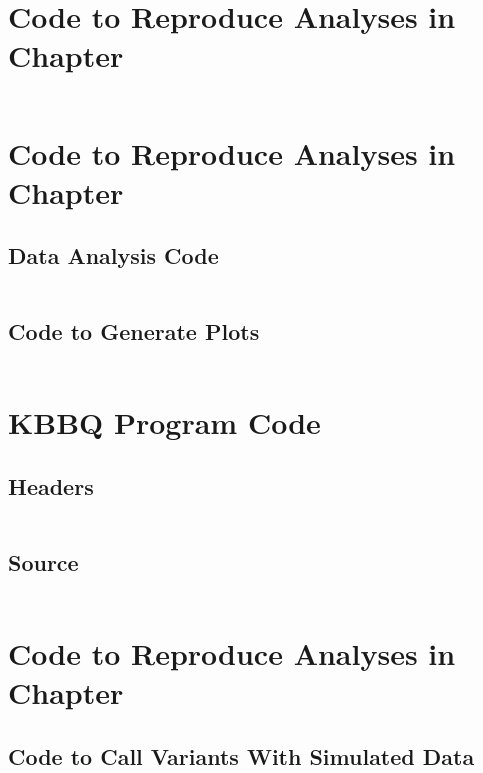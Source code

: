 \chapter{Code to Reproduce Analyses in Chapter \protect\structuredref{}}
\label{ch:structured_code}
\newpage
\inputminted[breaklines, breakanywhere, tabsize=2]{Makefile}{ch3/scripts/ch3_makefiles.txt}

\chapter{Code to Reproduce Analyses in Chapter \protect\kbbqref{}}
\label{ch:kbbq_plot_code}
\newpage
\section{Data Analysis Code}
\inputminted[breaklines, breakanywhere, tabsize=2]{Makefile}{ch4/scripts/ch4_makefiles.txt}
\section{Code to Generate Plots}
\inputminted[breaklines, breakanywhere, tabsize=2]{r}{ch4/scripts/plot_benchmarks.R}

\chapter{KBBQ Program Code}
\label{ch:kbbq_code}
\newpage
\section{Headers}
\inputminted[breaklines, breakanywhere, tabsize=2]{cpp}{ch4/scripts/kbbq_include.hh}
\section{Source}
\inputminted[breaklines, breakanywhere, tabsize=2]{cpp}{ch4/scripts/kbbq_src.cc}

\chapter{Code to Reproduce Analyses in Chapter \protect\evaluatingref{}}
\label{ch:evaluating_code}
\newpage
\section{Code to Call Variants With Simulated Data}
\inputminted[breaklines, breakanywhere, tabsize=2]{Makefile}{ch5/scripts/sim_variants_makefiles.txt}
